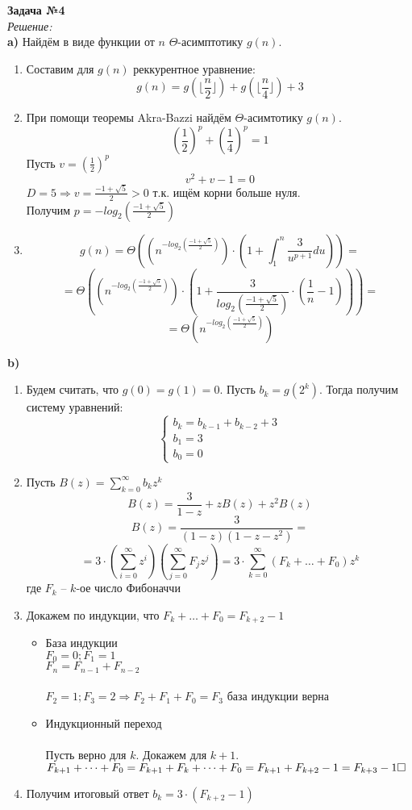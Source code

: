 \documentclass[11pt]{article}
\begin{document}
\textbf{Задача №4}
\\
	 	{\itshape Решение:}
	 	\\
	 	
\textbf{a)} Найдём в виде функции от $n$ $\Theta$-асимптотику $g(n)$. 
\begin{enumerate}
	\item Составим для $g(n)$ реккурентное уравнение:
	\[g(n) = g(\lfloor \frac{n}{2} \rfloor) + g(\lfloor \frac{n}{4} \rfloor) + 3 \]
	\item При помощи теоремы Akra-Bazzi найдём $\Theta$-асимтотику $g(n)$.
	\[(\frac{1}{2})^p +(\frac{1}{4})^p = 1\]
	Пусть $v = (\frac{1}{2})^p$
	\[v^2 + v - 1 = 0\]
	$D = 5 \Rightarrow v = \frac{-1 + \sqrt{5}}{2} >0$ т.к. ищём корни больше нуля. \\
	Получим $p = - log_{2}(\frac{-1 + \sqrt{5}}{2})$
	\item \[g(n) = \Theta ((n^{- log_{2}(\frac{-1 + \sqrt{5}}{2})})\cdot(1+\int_{1}^{n} \frac{3}{u^{p+1}}du)) =\]
	\[= \Theta ((n^{- log_{2}(\frac{-1 + \sqrt{5}}{2})})\cdot(1+ \frac{3}{log_{2}(\frac{-1 + \sqrt{5}}{2})} \cdot (\frac{1}{n}-1))) = \]
	\[= \Theta (n^{- log_{2}(\frac{-1 + \sqrt{5}}{2})})\]
\end{enumerate}
\textbf{b)}
\begin{enumerate}
	\item Будем считать, что $g(0) = g(1) = 0$. Пусть $b_k = g(2^k)$. Тогда получим систему уравнений:
	\[\begin{cases}
		b_k = b_{k-1} + b_{k-2} + 3 \\
		b_1 = 3 \\
		b_0 = 0
	\end{cases}
	\]
	\item Пусть $B(z) = \sum_{k=0}^{\infty} b_{k}z^{k}$
	\[B(z) = \frac{3}{1-z} + zB(z) + z^{2}B(z)\]
	\[B(z) =\frac{3}{(1-z)(1-z-z^2)} =\]
	\[=3\cdot (\sum_{i=0}^{\infty} z^{i})(\sum_{j=0}^{\infty} F_{j} z^{j}) = 3 \cdot \sum_{k=0}^{\infty} (F_k + \dots + F_0)z^k\]
	где $F_k$ -- $k$-ое число Фибоначчи
	\item Докажем по индукции, что $F_k + \dots + F_0 = F_{k+2} -1$
	\begin{itemize}
		\item База индукции\\
		$F_0 = 0; F_1 = 1$ \\
		$F_n = F_{n-1} + F_{n-2}$\\\\
		$F_2 = 1; F_3 = 2 \Rightarrow F_2+F_1+F_0 = F_3$ база индукции верна
		\item Индукционный переход\\\\
		Пусть верно для $k$. Докажем для $k+1$.\\
		$F_{k+1} + \dots + F_{0} = F_{k+1} + F_{k} +\dots+ F_0 = F_{k+1} + F_{k+2} - 1 = F_{k+3} - 1 \\ \square$ 
	\end{itemize}
	\item Получим итоговый ответ $b_k = 3 \cdot (F_{k+2}-1)$
\end{enumerate}
\end{document}
